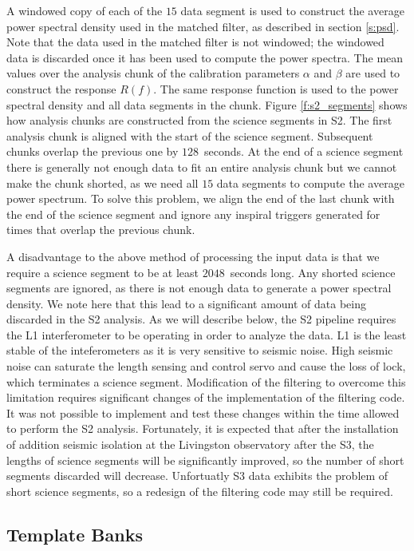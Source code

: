 A windowed copy of each of the $15$ data segment is used to construct the
average power spectral density used in the matched filter, as described in
section \ref{s:psd}. Note that the data used in the matched filter is not
windowed; the windowed data is discarded once it has been used to compute the
power spectra.  The mean values over the analysis chunk of the calibration
parameters $\alpha$ and $\beta$ are used to construct the response $R(f)$. The
same response function is used to the power spectral density and all data
segments in the chunk.  Figure \ref{f:s2_segments} shows how analysis chunks
are constructed from the science segments in S2. The first analysis chunk is
aligned with the start of the science segment. Subsequent chunks overlap the
previous one by $128$~seconds. At the end of a science segment there is
generally not enough data to fit an entire analysis chunk but we cannot make
the chunk shorted, as we need all $15$ data segments to compute the average
power spectrum. To solve this problem, we align the end of the last chunk with
the end of the science segment and ignore any inspiral triggers generated for
times that overlap the previous chunk. 

A disadvantage to the above method of processing the input data is that we
require a science segment to be at least $2048$~seconds long. Any shorted
science segments are ignored, as there is not enough data to generate a power
spectral density. We note here that this lead to a significant amount of data
being discarded in the S2 analysis. As we will describe below, the S2 pipeline
requires the L1 interferometer to be operating in order to analyze the data.
L1 is the least stable of the inteferometers as it is very sensitive to
seismic noise. High seismic noise can saturate the length sensing and control
servo and cause the loss of lock, which terminates a science segment.
Modification of the filtering to overcome this limitation requires significant
changes of the implementation of the filtering code. It was not possible to
implement and test these changes within the time allowed to perform the S2
analysis. Fortunately, it is expected that after the installation of addition
seismic isolation at the Livingston observatory after the S3, the lengths of
science segments will be significantly improved, so the number of short
segments discarded will decrease. Unfortuatly S3 data exhibits the
problem of short science segments, so a redesign of the filtering code may
still be required.

\subsection{Template Banks}
\label{ss:templatebank}

